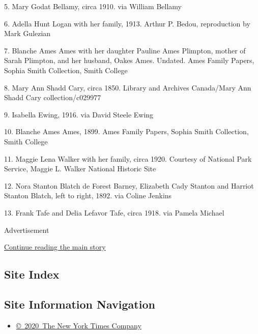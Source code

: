 5. Mary Godat Bellamy, circa 1910. via William Bellamy

6. Adella Hunt Logan with her family, 1913. Arthur P. Bedou,
reproduction by Mark Gulezian

7. Blanche Ames Ames with her daughter Pauline Ames Plimpton, mother of
Sarah Plimpton, and her husband, Oakes Ames. Undated. Ames Family
Papers, Sophia Smith Collection, Smith College

8. Mary Ann Shadd Cary, circa 1850. Library and Archives Canada/Mary Ann
Shadd Cary collection/c029977

9. Isabella Ewing, 1916. via David Steele Ewing

10. Blanche Ames Ames, 1899. Ames Family Papers, Sophia Smith
Collection, Smith College

11. Maggie Lena Walker with her family, circa 1920. Courtesy of National
Park Service, Maggie L. Walker National Historic Site

12. Nora Stanton Blatch de Forest Barney, Elizabeth Cady Stanton and
Harriot Stanton Blatch, left to right, 1892. via Coline Jenkins

13. Frank Tafe and Delia Lefavor Tafe, circa 1918. via Pamela Michael

Advertisement

\protect\hyperlink{after-bottom}{Continue reading the main story}

\hypertarget{site-index}{%
\subsection{Site Index}\label{site-index}}

\hypertarget{site-information-navigation}{%
\subsection{Site Information
Navigation}\label{site-information-navigation}}

\begin{itemize}
\tightlist
\item
  \href{https://help.nytimes3xbfgragh.onion/hc/en-us/articles/115014792127-Copyright-notice}{©~2020~The
  New York Times Company}
\end{itemize}

